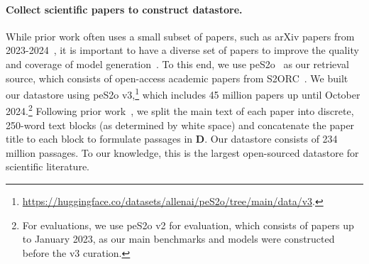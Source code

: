 \paragraph{Collect scientific papers to construct datastore.} 
 While prior work often uses a small subset of papers, such as arXiv papers from 2023-2024~\citep{zheng2024openresearcher}, it is important to have a diverse set of papers to improve the quality and coverage of model generation~\citep{shao2024scaling}. 
To this end, we use peS2o~\citep{soldaini2024dolma} as our retrieval source, which consists of open-access academic papers from S2ORC~\citep{lo-etal-2020-s2orc}. We  built our datastore using peS2o v3,\footnote{\url{https://huggingface.co/datasets/allenai/peS2o/tree/main/data/v3}.} which includes 45 million papers up until October 2024.\footnote{
For evaluations, we use peS2o v2 for evaluation, which consists of papers up to January 2023, as our main benchmarks and models were constructed before the v3 curation. }
 Following prior work~\citep{shao2024scaling}, we split the main text of each paper into discrete, 250-word text blocks (as determined by white space) and concatenate the paper title to each block to formulate passages in $\mathbf{D}$.
Our datastore consists of 234 million passages. 
To our knowledge, this is the largest open-sourced datastore for scientific literature. 


